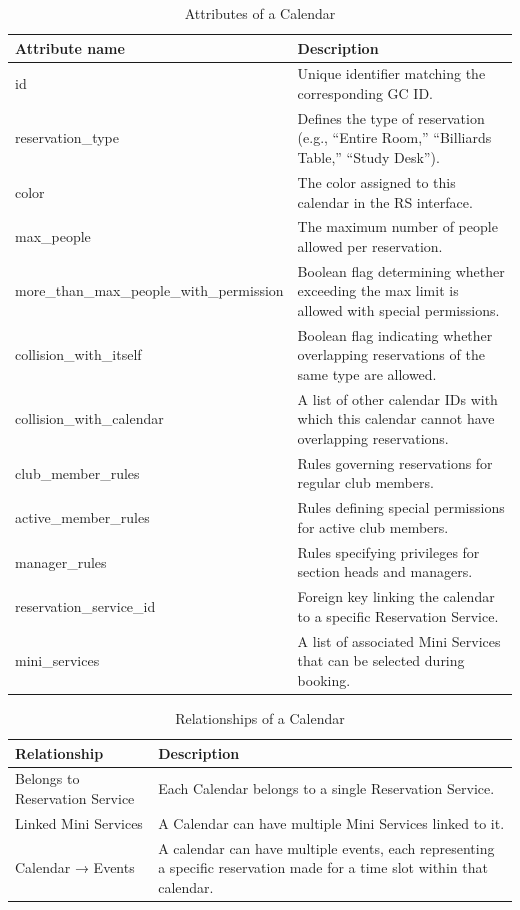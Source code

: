\begin{table}[H]
  \centering
  \begin{tabularx}{\textwidth}{|l|X|}
  \hline
  \textbf{Attribute name} & \textbf{Description} \\
  \hline
  id & Unique identifier matching the corresponding GC ID. \\
  \hline
  reservation\_type & Defines the type of reservation (e.g., “Entire Room,” “Billiards Table,” “Study Desk”). \\
  \hline
  color & The color assigned to this calendar in the RS interface. \\
  \hline
  max\_people & The maximum number of people allowed per reservation. \\
  \hline
  more\_than\_max\_people\_with\_permission & Boolean flag determining whether exceeding the max limit is allowed with special permissions. \\
  \hline
  collision\_with\_itself & Boolean flag indicating whether overlapping reservations of the same type are allowed. \\
  \hline
  collision\_with\_calendar & A list of other calendar IDs with which this calendar cannot have overlapping reservations. \\
  \hline
  club\_member\_rules & Rules governing reservations for regular club members. \\
  \hline
  active\_member\_rules & Rules defining special permissions for active club members. \\
  \hline
  manager\_rules & Rules specifying privileges for section heads and managers. \\
  \hline
  reservation\_service\_id & Foreign key linking the calendar to a specific Reservation Service. \\
  \hline
  mini\_services & A list of associated Mini Services that can be selected during booking. \\
  \hline
  \end{tabularx}
  \caption{Attributes of a Calendar}
  \label{tab:calendar-attributes}
  \end{table}
  
  \begin{table}[H]
  \centering
  \begin{tabularx}{\textwidth}{|l|X|}
  \hline
  \textbf{Relationship} & \textbf{Description} \\
  \hline
  Belongs to Reservation Service & Each Calendar belongs to a single Reservation Service. \\
  \hline
  Linked Mini Services & A Calendar can have multiple Mini Services linked to it. \\
  \hline
  Calendar → Events & A calendar can have multiple events, each representing a specific reservation made for a time slot within that calendar. \\
  \hline
  \end{tabularx}
  \caption{Relationships of a Calendar}
  \label{tab:calendar-relationships}
  \end{table}

